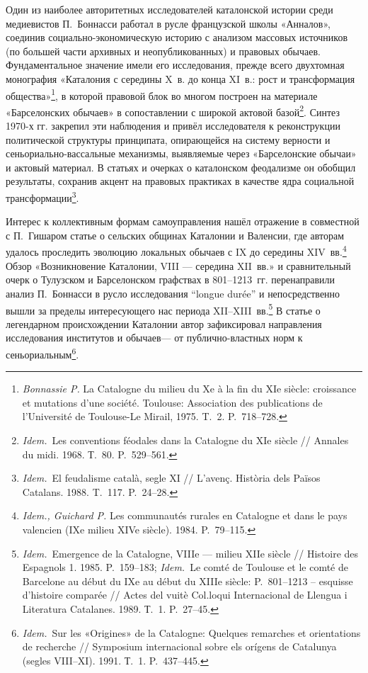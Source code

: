 Один из наиболее авторитетных исследователей каталонской истории среди медиевистов П.~Боннасси работал в русле французской школы «Анналов», соединив социально-экономическую историю с анализом массовых источников (по большей части архивных и неопубликованных) и правовых обычаев. Фундаментальное значение имели его исследования, прежде всего двухтомная монография «Каталония с середины X~в. до конца XI~в.: рост и трансформация общества»\footnote{\emph{Bonnassie P.} La Catalogne du milieu du Xe à la fin du XIe siècle: croissance et mutations d’une société. Toulouse: Association des publications de l’Université de Toulouse-Le Mirail, 1975. T.~2. P.~718--728.}, в которой правовой блок во многом построен на материале «Барселонских обычаев» в сопоставлении с широкой актовой базой\footnote{\emph{Idem.}~Les conventions féodales dans la Catalogne du XIe siècle // Annales du midi. 1968. Т.~80. P.~529--561.}. Синтез 1970-х гг. закрепил эти наблюдения и привёл исследователя к реконструкции политической структуры принципата, опирающейся на систему верности и сеньориально-вассальные механизмы, выявляемые через «Барселонские обычаи» и актовый материал. В статьях и очерках о каталонском феодализме он обобщил результаты, сохранив акцент на правовых практиках в качестве ядра социальной трансформации\footnote{\emph{Idem.}~El feudalisme català, segle XI // L’avenç. Història dels Països Catalans. 1988. T.~117. P.~24--28.}.

Интерес к коллективным формам самоуправления нашёл отражение в совместной с П.~Гишаром статье о сельских общинах Каталонии и Валенсии, где авторам удалось проследить эволюцию локальных обычаев с IX до середины XIV~вв.\footnote{\emph{Idem., Guichard P.} Les communautés rurales en Catalogne et dans le pays valencien (IXe milieu XIVe siècle). 1984. P.~79--115.} Обзор «Возникновение Каталонии, VIII --- середина XII~вв.» и сравнительный очерк о Тулузском и Барселонском графствах в 801--1213~гг. перенаправили анализ П.~Боннасси в русло исследования “longue durée” и непосредственно вышли за пределы интересующего нас периода XII--XIII~вв.\footnote{\emph{Idem.}~Emergence de la Catalogne, VIIIe --- milieu XIIe siècle // Histoire des Espagnols 1. 1985. P.~159--183; \emph{Idem.}~Le comté de Toulouse et le comté de Barcelone au début du IXe au début du XIIIe siècle: P.~801--1213 -- esquisse d’histoire comparée // Actes del vuitè Col.loqui Internacional de Llengua i Literatura Catalanes. 1989. Т.~1. P.~27--45.} В статье о легендарном происхождении Каталонии автор зафиксировал направления исследования институтов и обычаев--- от публично-властных норм к сеньориальным\footnote{\emph{Idem.}~Sur les «Origines» de la Catalogne: Quelques remarches et orientations de recherche // Symposium internacional sobre els orígens de Catalunya (segles VIII--XI). 1991. Т.~1. P.~437--445.}.

